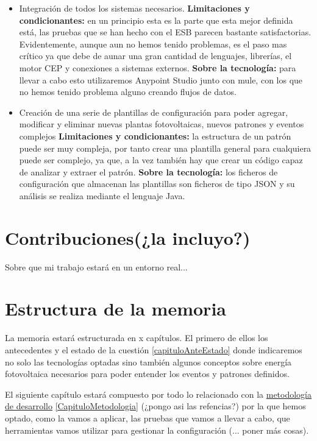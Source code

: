 \documentclass[spanish,twoside,openright,12pt,a4paper]{book}
\begin{document}
\begin{itemize}
    \item Integración de todos los sistemas necesarios.\newline
    \textbf{Limitaciones y condicionantes:} en un principio esta es la parte que esta mejor definida está, las pruebas que se han hecho con el ESB parecen bastante satisfactorias. Evidentemente, aunque aun no hemos tenido problemas, es el paso mas crítico ya que debe de aunar una gran cantidad de lenguajes, librerías, el motor CEP y conexiones a sistemas externos.\newline
    \textbf{Sobre la tecnología:} para llevar a cabo esto utilizaremos Anypoint Studio junto con mule, con los que no hemos tenido problema alguno creando flujos de datos.
    \item Creación de una serie de plantillas de configuración para poder agregar, modificar y eliminar nuevas plantas fotovoltaicas, nuevos patrones y eventos complejos
    \textbf{Limitaciones y condicionantes:} la estructura de un patrón puede ser muy compleja, por tanto crear una plantilla general para cualquiera puede ser complejo, ya que, a la vez también hay que crear un código capaz de analizar y extraer el patrón.
    \textbf{Sobre la tecnología:} los ficheros de configuración que almacenan las plantillas son ficheros de tipo JSON y su análisis se realiza mediante el lenguaje Java.
\end{itemize}

\section{Contribuciones(¿la incluyo?)}
Sobre que mi trabajo estará en un entorno real...

\section{Estructura de la memoria}
La memoria estará estructurada en x capítulos. El primero de ellos los antecedentes y el estado de la cuestión \ref{capituloAnteEstado} donde indicaremos no solo las tecnologías optadas sino también algunos conceptos sobre energía fotovoltaica necesarios para poder entender los eventos y patrones definidos.

El siguiente capítulo estará compuesto por todo lo relacionado con la \href{CapituloMetodologia}{metodología de desarrollo} \ref{CapituloMetodologia} (¿pongo asi las refencias?) por la que hemos optado, como la vamos a aplicar, las pruebas que vamos a llevar a cabo, que herramientas vamos utilizar para gestionar la configuración (... poner más cosas).
\end{document}
